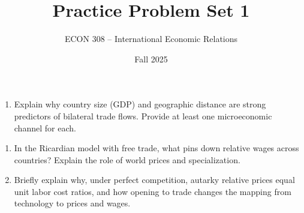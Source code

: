 \documentclass[11pt]{article}
\title{Practice Problem Set 1}
\author{ECON 308 -- International Economic Relations}
\date{Fall 2025}
\begin{document}
\maketitle



\begin{enumerate}[leftmargin=*]
\item Explain why country size (GDP) and geographic distance are strong predictors of bilateral trade flows. Provide at least one microeconomic channel for each.
\end{enumerate}


\begin{enumerate}[leftmargin=*, resume]
\item In the Ricardian model with free trade, what pins down relative wages across countries? Explain the role of world prices and specialization.
\item Briefly explain why, under perfect competition, autarky relative prices equal unit labor cost ratios, and how opening to trade changes the mapping from technology to prices and wages.
\end{enumerate}
\bigskip
\end{document}
